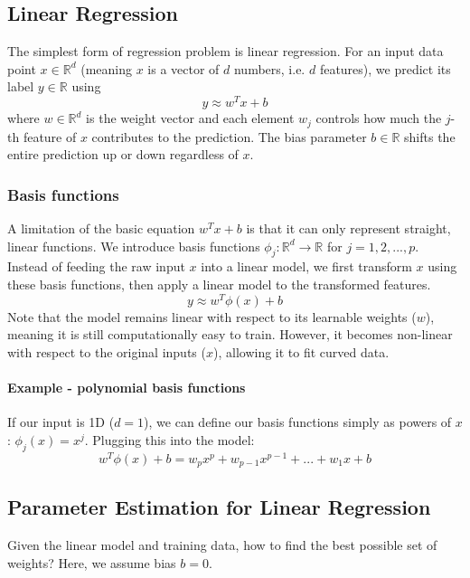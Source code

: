 \documentclass[../Probability.tex]{subfiles}
\begin{document}
\subsection{Linear Regression}
The simplest form of regression problem is linear regression.\newline
For an input data point $x \in \mathbb{R}^d$ (meaning $x$ is a vector of $d$ numbers, i.e. $d$ features), we predict its label $y \in \mathbb{R}$ using
$$y \approx w^T x + b$$
where $w \in \mathbb{R}^d$ is the weight vector and each element $w_j$ controls how much the $j$-th feature of $x$ contributes to the prediction.
The bias parameter $b \in \mathbb{R}$ shifts the entire prediction up or down regardless of $x$.
\subsubsection{Basis functions}
A limitation of the basic equation $w^T x + b$ is that it can only represent straight, linear functions.\newline
We introduce basis functions $\phi_j : \mathbb{R}^d \rightarrow \mathbb{R}$ for $j=1, 2, ..., p$.
Instead of feeding the raw input $x$ into a linear model, we first transform $x$ using these basis functions, then apply a linear model to the transformed features.
$$y \approx w^T \phi(x) + b$$
Note that the model remains linear with respect to its learnable weights ($w$), meaning it is still computationally easy to train. However, it becomes non-linear with respect to the original inputs ($x$), allowing it to fit curved data.
\paragraph{Example - polynomial basis functions} If our input is 1D ($d=1$), we can define our basis functions simply as powers of $x$: $\phi_j(x) = x^j$.\newline
Plugging this into the model:
$$w^T \phi(x) + b = w_p x^p + w_{p-1} x^{p-1} + ... + w_1 x + b$$

\subsection{Parameter Estimation for Linear Regression}
Given the linear model and training data, how to find the best possible set of weights?\newline
Here, we assume bias $b=0$.
\end{document}
